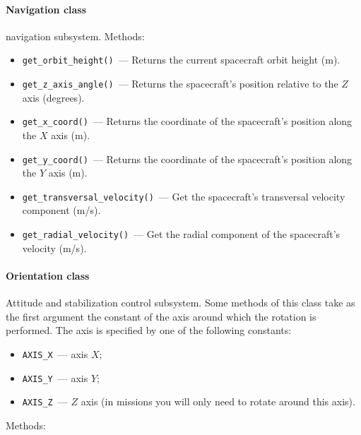 \documentclass[12pt,a4paper]{article}
\begin{document}
\paragraph{Navigation class}

navigation subsystem. Methods:

\begin{itemize}
\item \verb'get_orbit_height()'~--- Returns the current spacecraft orbit height (m).
\item \verb'get_z_axis_angle()'~--- Returns the spacecraft's position relative to the $Z$ axis (degrees).
\item \verb'get_x_coord()'~--- Returns the coordinate of the spacecraft's position along the $X$ axis (m).
\item \verb'get_y_coord()'~--- Returns the coordinate of the spacecraft's position along the $Y$ axis (m).
\item \verb'get_transversal_velocity()'~--- Get the spacecraft's transversal velocity component (m/s).
\item \verb'get_radial_velocity()'~--- Get the radial component of the spacecraft's velocity (m/s).
\end{itemize}

\paragraph{Orientation class}

Attitude and stabilization control subsystem. Some methods of this class take as the first argument the constant of the axis around which the rotation is performed. The axis is specified by one of the following constants:

\begin{itemize}
\item \verb'AXIS_X'~--- axis $X$;
\item \verb'AXIS_Y'~--- axis $Y$;
\item \verb'AXIS_Z'~--- $Z$ axis (in missions you will only need to rotate around this axis).
\end{itemize}

Methods:
\end{document}
